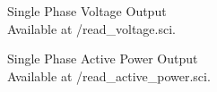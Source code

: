 \begin{scicode}
{Single Phase Voltage Output \\ Available at
  \LocMODscibrief/read\_voltage.sci.} 
\label{sci:voltage-modbus}

\end{scicode}

\begin{scicode}
{Single Phase Active Power Output \\ Available at
  \LocMODscibrief/read\_active\_power.sci.} 
\label{sci:modbus-power}

\end{scicode}

